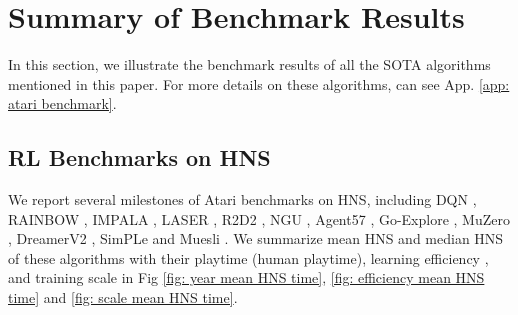 \documentclass[nohyperref]{article}
\theoremstyle{plain}
\begin{document}
\clearpage
\section{Summary of Benchmark Results}
\label{app: Summary of Benchmark Results}

In this section, we illustrate the benchmark results of all the SOTA algorithms mentioned in this paper. For more details on these algorithms, can see App. \ref{app: atari benchmark}.


\subsection{RL Benchmarks on HNS}
\label{app: RL Benchmarks on HNS}
We report several milestones of Atari benchmarks on HNS, including DQN \citep{dqn}, RAINBOW \citep{rainbow}, IMPALA \citep{impala}, LASER \citep{laser}, R2D2 \citep{r2d2}, NGU \citep{ngu}, Agent57 \citep{agent57}, Go-Explore \citep{goexplore}, MuZero \citep{muzero}, DreamerV2 \citep{dreamerv2}, SimPLe \citep{modelbasedatari} and Muesli \citep{muesli}. We summarize mean HNS and median HNS of these algorithms  with their playtime (human playtime), learning efficiency , and training scale in Fig \ref{fig: year mean HNS time}, \ref{fig: efficiency mean HNS time} and \ref{fig: scale mean HNS time}.


\begin{figure*}[!t]
    \centering
	\centering
	\caption{SOTA algorithms of Atari 57 games on mean and median HNS (\%) and playtime.}
	\label{fig: year mean HNS time}
\end{figure*}


\begin{figure*}[!t]
    \centering
	\centering
	\caption{SOTA algorithms of Atari 57 games on mean and median HNS (\%) and corresponding learning efficiency calculated by $\frac{\text{MEAN HNS/MEDIAN HNS}}{\text{TRAINING FRAMES}}$.}
	\label{fig: efficiency mean HNS time}
\end{figure*}
\end{document}
